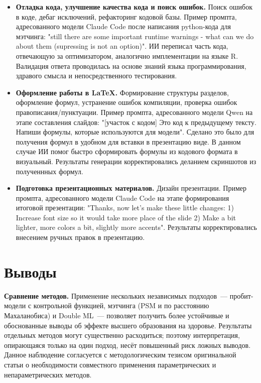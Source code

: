 \documentclass[a4paper,12pt]{article}
\begin{document}
\begin{itemize}
    \item \textbf{Отладка кода, улучшение качества кода и поиск ошибок.}
          Поиск ошибок в коде, дебаг исключений, рефакторинг кодовой базы. Пример промпта, адресованного модели Claude Code после написания python-кода для мэтчинга: "still there are some important runtime warnings - what can we do about them (supressing is not an option)". ИИ переписал часть кода, отвечающую за оптимизатором, аналогично имплементации на языке R. Валидация ответа проводилась на основе знаний языка программирования, здравого смысла и непосредственного тестирования.
    

    \item \textbf{Оформление работы в \LaTeX{}.}
          Формирование структуры разделов, оформление формул, устранение ошибок компиляции, проверка ошибок правописания/пунктуации. Пример промпта, адресованного модели Qwen на этапе составления слайдов: "[участок с кодом] Это код к предыдущему тексту. Напиши формулы, которые используются для модели". Сделано это было для получения формул в удобном для вставки в презентацию виде. В данном случае ИИ помог быстро сформировать формулы из кодового формата в визуальный. Результаты генерации корректировались деланием скриншотов из полученнных формул.

    \item \textbf{Подготовка презентационных материалов.}
          Дизайн презентации. Пример промпта, адресованного модели Claude Code на этапе формирования итоговой презентации: "Thanks, now let's make these little changes: 1) Increase font size so it would take more place of the slide 2) Make a bit lighter, more colors a bit, slightly more accents". Результаты корректировались внесением ручных правок в презентацию.
\end{itemize}
\section{Выводы}
\textbf{Сравнение методов.}
Применение нескольких независимых подходов~--- пробит-модели с контрольной функцией, мэтчинга (PSM и по расстоянию Махаланобиса) и Double ML~--- позволяет получить более устойчивые и обоснованные выводы об эффекте высшего образования на здоровье.
Результаты отдельных методов могут существенно расходиться; поэтому интерпретация, опирающаяся только на один подход, несёт повышенный риск ложных выводов.
Данное наблюдение согласуется с методологическим тезисом оригинальной статьи о необходимости совместного применения параметрических и непараметрических методов.
\end{document}
